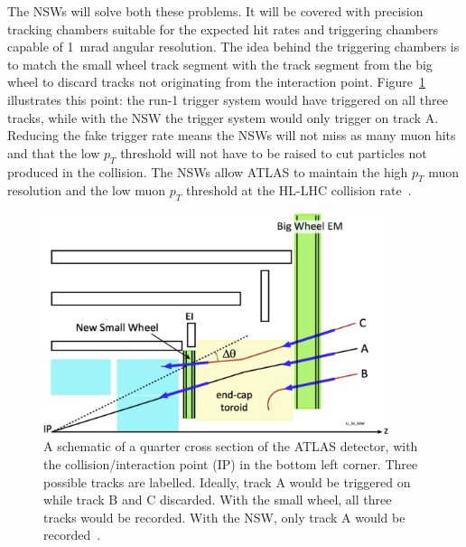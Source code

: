 The NSWs will solve both these problems. It will be covered with precision tracking chambers suitable for the expected hit rates and triggering chambers capable of \SI{1}{mrad} angular resolution. The idea behind the triggering chambers is to match the small wheel track segment with the track segment from the big wheel to discard tracks not originating from the interaction point. Figure~\ref{fig:nsw_track_triggering} illustrates this point: the run-1 trigger system would have triggered on all three tracks, while with the NSW the trigger system would only trigger on track A. Reducing the fake trigger rate means the NSWs will not miss as many muon hits and that the low $p_T$ threshold will not have to be raised to cut particles not produced in the collision. The NSWs allow ATLAS to maintain the high $p_T$ muon resolution and the low muon $p_T$ threshold at the HL-LHC collision rate~\cite{nsw_tdr}.


\begin{figure}
    \centering
    \includegraphics[width = 0.9\textwidth]{figures/perez-codina_NSW_tracks.jpg}
    \caption{A schematic of a quarter cross section of the ATLAS detector, with the collision/interaction point (IP) in the bottom left corner. Three possible tracks are labelled. Ideally, track A would be triggered on while track B and C discarded. With the small wheel, all three tracks would be recorded. With the NSW, only track A would be recorded~\cite{nsw_tdr}.}
    \label{fig:nsw_track_triggering}
\end{figure}

